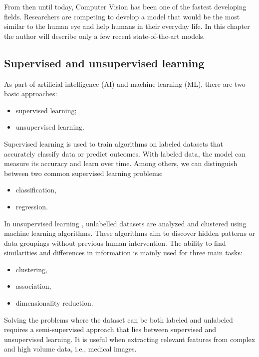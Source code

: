 \documentclass[
]{krantz}
\providecommand{\tightlist}{%
  \setlength{\itemsep}{0pt}\setlength{\parskip}{0pt}}
\begin{document}
From then until today, Computer Vision has been one of the fastest developing fields. Researchers are competing to develop a model that would be the most similar to the human eye and help humans in their everyday life. In this chapter the author will describe only a few recent state-of-the-art models.

\hypertarget{supervised-and-unsupervised-learning}{%
\subsection{Supervised and unsupervised learning}\label{supervised-and-unsupervised-learning}}

As part of artificial intelligence (AI) and machine learning (ML), there are two basic approaches:

\begin{itemize}
\tightlist
\item
  supervised learning;
\item
  unsupervised learning.
\end{itemize}

Supervised learning \citep{supervised} is used to train algorithms on labeled datasets that accurately classify data or predict outcomes. With labeled data, the model can measure its accuracy and learn over time. Among others, we can distinguish between two common supervised learning problems:

\begin{itemize}
\tightlist
\item
  classification,
\item
  regression.
\end{itemize}

In unsupervised learning \citep{unsupervised}, unlabelled datasets are analyzed and clustered using machine learning algorithms. These algorithms aim to discover hidden patterns or data groupings without previous human intervention. The ability to find similarities and differences in information is mainly used for three main tasks:

\begin{itemize}
\tightlist
\item
  clustering,
\item
  association,
\item
  dimensionality reduction.
\end{itemize}

Solving the problems where the dataset can be both labeled and unlabeled requires a semi-supervised approach that lies between supervised and unsupervised learning. It is useful when extracting relevant features from complex and high volume data, i.e., medical images.
\end{document}
